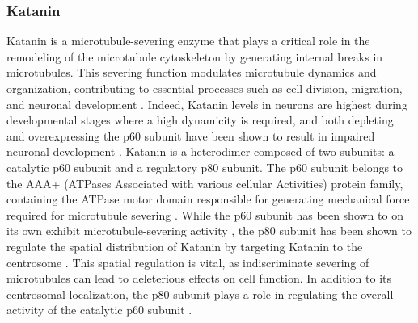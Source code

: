 \subsubsection{Katanin}
\label{sec:Katanin_intro}
Katanin is a microtubule-severing enzyme that plays a critical role in the remodeling of the microtubule cytoskeleton by generating internal breaks in microtubules. This severing function modulates microtubule dynamics and organization, contributing to essential processes such as cell division, migration, and neuronal development \parencite{ROLLMECAK201096, Lombino2019}. Indeed, Katanin levels in neurons are highest during developmental stages where a high dynamicity is required, and both depleting and overexpressing the p60 subunit have been shown to result in impaired neuronal development \parencite{Karabay2004}. Katanin is a heterodimer composed of two subunits: a catalytic p60 subunit and a regulatory p80 subunit. The p60 subunit belongs to the AAA+ (ATPases Associated with various cellular Activities) protein family, containing the ATPase motor domain responsible for generating mechanical force required for microtubule severing \parencite{Johjima2015, McNally2014}. While the p60 subunit has been shown to on its own exhibit microtubule-severing activity \parencite{McNally2014}, the p80 subunit has been shown to regulate the spatial distribution of Katanin by targeting Katanin to the centrosome \parencite{Hartman1998}. This spatial regulation is vital, as indiscriminate severing of microtubules can lead to deleterious effects on cell function. In addition to its centrosomal localization, the p80 subunit plays a role in regulating the overall activity of the catalytic p60 subunit \parencite{McNally2000}. \par

